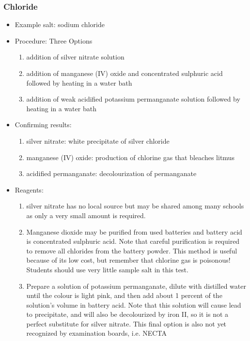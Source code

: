 \subsubsection{Chloride}
\begin{itemize}
\item{Example salt: sodium chloride}
\item{Procedure: Three Options
\begin{enumerate}
\item{addition of silver nitrate solution}
\item{addition of manganese (IV) oxide and concentrated sulphuric acid followed by heating in a water bath}
\item{addition of weak acidified potassium permanganate solution followed by heating in a water bath}
\end{enumerate}
} %
\item{Confirming results:
\begin{enumerate}
\item{silver nitrate: white precipitate of silver chloride} 
\item{manganese (IV) oxide: production of chlorine gas that bleaches litmus} 
\item{acidified permanganate: decolourization of permanganate}
\end{enumerate}
} %
\item{Reagents:
\begin{enumerate}
\item{silver nitrate has no local source but may be shared among many schools as only a very small amount is required.}
\item{Manganese dioxide may be purified from used batteries and battery acid is concentrated sulphuric acid. Note that careful purification is required to remove all chlorides from the battery powder. This method is useful because of its low cost, but remember that chlorine gas is poisonous! Students should use very little sample salt in this test.}
\item{Prepare a solution of potassium permanganate, dilute with distilled water until the colour is light pink, and then add about 1 percent of the solution's volume in battery acid. Note that this solution will cause lead to precipitate, and will also be decolourized by iron II, so it is not a perfect substitute for silver nitrate. This final option is also not yet recognized by examination boards, i.e. NECTA}
\end{enumerate}
} %
\end{itemize}

